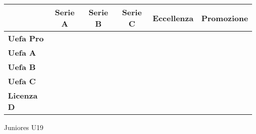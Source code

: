 \documentclass[../uefaC.tex]{subfiles}
\begin{document}
\begin{table}[!htbp]
    \begin{tabular}{l|l|l|l|l|l|}
    \cline{2-6}
                                             & \multicolumn{1}{c|}{\textbf{Serie A}} & \multicolumn{1}{c|}{\textbf{Serie B}}           & \multicolumn{1}{c|}{\textbf{Serie C}}           & \multicolumn{1}{c|}{\textbf{Eccellenza}}        & \multicolumn{1}{c|}{\textbf{Promozione}}        \\ \hline
    \multicolumn{1}{|l|}{\textbf{Uefa Pro}}  & \cellcolor[HTML]{FE0000}              & \cellcolor[HTML]{FE0000}                        & \cellcolor[HTML]{FE0000}                        & \cellcolor[HTML]{FE0000}                        & \cellcolor[HTML]{FE0000}                        \\ \hline
    \multicolumn{1}{|l|}{\textbf{Uefa A}}    & \cellcolor[HTML]{F8FF00}              & \cellcolor[HTML]{F8FF00}{\color[HTML]{FFFFFF} } & \cellcolor[HTML]{F8FF00}{\color[HTML]{FFFFFF} } & \cellcolor[HTML]{F8FF00}{\color[HTML]{FFFFFF} } & \cellcolor[HTML]{F8FF00}{\color[HTML]{FFFFFF} } \\ \hline
    \multicolumn{1}{|l|}{\textbf{Uefa B}}    &                                       &                                                 & \cellcolor[HTML]{34FF34}                        & \cellcolor[HTML]{34FF34}                        & \cellcolor[HTML]{34FF34}                        \\ \hline
    \multicolumn{1}{|l|}{\textbf{Uefa C}}    &                                       &                                                 &                                                 &                                                 &                                                 \\ \hline
    \multicolumn{1}{|l|}{\textbf{Licenza D}} &                                       &                                                 & \cellcolor[HTML]{C92FD7}                        & \cellcolor[HTML]{C92FD7}                        & \cellcolor[HTML]{C92FD7}                        \\ \hline
    \end{tabular}
\end{table}

Juniores U19 \hfill \\
\end{document}
